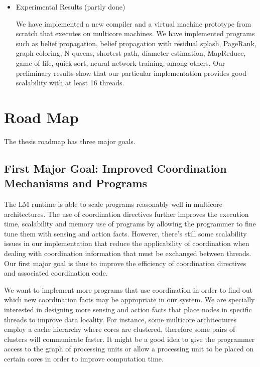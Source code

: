 \documentclass[10pt]{article}
\begin{document}
\begin{itemize}
   \item Experimental Results (partly done)

   We have implemented a new compiler and a virtual machine prototype from
   scratch that executes on multicore machines.  We have implemented programs
   such as belief propagation, belief propagation with residual splash,
   PageRank, graph coloring, N queens, shortest path, diameter estimation,
   MapReduce, game of life, quick-sort, neural network training, among others.
   Our preliminary results show that our particular implementation provides
   good scalability with at least 16 threads.
   
\end{itemize}

\section{Road Map}

The thesis roadmap has three major goals.

\subsection{First Major Goal: Improved Coordination Mechanisms and Programs}

The LM runtime is able to scale programs reasonably well in multicore
architectures. The use of coordination directives further improves the execution
time, scalability and memory use of programs by allowing the programmer to
fine tune them with sensing and action facts.
However, there's still some scalability issues in our implementation that reduce the applicability of
coordination when dealing with coordination information that must be
exchanged between threads. Our first major goal is thus to improve
the efficiency of coordination directives and associated coordination code.

We want to implement more programs that use coordination in order to find out
which new coordination facts may be appropriate in our system. We are specially
interested in designing more sensing and action facts that place nodes in
specific threads to improve data locality.  For instance, some multicore
architectures employ a cache hierarchy where cores are clustered, therefore some
pairs of clusters will communicate faster. It might be a good idea to give the
programmer access to the graph of processing units or allow a processing unit to
be placed on certain cores in order to improve computation time.
\end{document}
